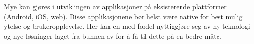 Mye kan gjøres i utviklingen av applikasjoner på eksisterende plattformer (Android, iOS, web). Disse applikasjonene bør helst være native for best
mulig ytelse og brukeropplevelse. Her kan en med fordel nyttiggjøre seg av ny teknologi og nye løsninger laget fra bunnen av for å få til dette på en bedre måte.
